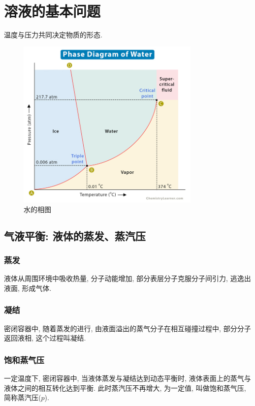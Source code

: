 \documentclass[12pt, a4paper, oneside]{ctexbook}
\begin{document}
\section{溶液的基本问题}
温度与压力共同决定物质的形态. \\
\begin{figure}[htbp]
    \centering
    \includegraphics[width=0.8\textwidth]{pics/phase_diagram.jpg}
    \caption{水的相图}
\end{figure}
\subsection{气液平衡: 液体的蒸发、蒸汽压}
\subsubsection{蒸发}
液体从周围环境中吸收热量, 分子动能增加, 部分表层分子克服分子间引力, 逃逸出液面, 形成气体. \\
\subsubsection{凝结}
密闭容器中, 随着蒸发的进行, 由液面溢出的蒸气分子在相互碰撞过程中, 部分分子返回液相, 这个过程叫凝结. \\
\subsubsection{饱和蒸气压}
一定温度下, 密闭容器中, 当液体蒸发与凝结达到动态平衡时, 液体表面上的蒸气与液体之间的相互转化达到平衡. 此时蒸汽压不再增大, 为一定值, 叫做饱和蒸气压, 简称蒸汽压($p$). \\
\end{document}
